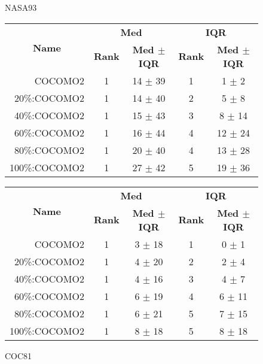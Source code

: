 \begin{figure}[!t]
\begin{center}
\caption{NASA93}
\scriptsize
\label{fig:nasa93}
\begin{tabular}{|r|c|c|c|c|}
\hline
\multicolumn{1}{|c|}{\multirow{2}{*}{\textbf{Name}}} & \multicolumn{2}{c|}{\textbf{Med}}     & \multicolumn{2}{c|}{\textbf{IQR}} \\ \cline{2-5} 
\multicolumn{1}{|c|}{}                               & \textbf{Rank} & \textbf{Med $\pm$ IQR} & \textbf{Rank} & \textbf{Med $\pm$ IQR} \\ \hline
    COCOMO2  & 1 & 14 $\pm$ 39   & 1    & 1 $\pm$ 2     \\ \cline{4-5}
20\%:COCOMO2 & 1 & 14 $\pm$ 40   & 2    & 5 $\pm$ 8   \\ \cline{4-5}
40\%:COCOMO2 & 1 & 15 $\pm$ 43   & 3    & 8 $\pm$ 14   \\ \cline{4-5}
60\%:COCOMO2 & 1 & 16 $\pm$ 44   & 4    & 12 $\pm$ 24   \\
80\%:COCOMO2 & 1 & 20 $\pm$ 40   & 4    & 13 $\pm$ 28   \\\cline{4-5}
100\%:COCOMO2 & 1 & 27 $\pm$ 42  & 5    & 19 $\pm$ 36    \\ \hline  
\end{tabular}

\caption{COC81}
\scriptsize
\label{fig:coc81}
\begin{tabular}{|r|c|c|c|c|}
\hline
\multicolumn{1}{|c|}{\multirow{2}{*}{\textbf{Name}}} & \multicolumn{2}{c|}{\textbf{Med}}     & \multicolumn{2}{c|}{\textbf{IQR}} \\ \cline{2-5} 
\multicolumn{1}{|c|}{}                               & \textbf{Rank} & \textbf{Med $\pm$ IQR} & \textbf{Rank} & \textbf{Med $\pm$ IQR} \\ \hline
    COCOMO2  & 1 & 3 $\pm$ 18   & 1    & 0 $\pm$ 1     \\ \cline{4-5}
20\%:COCOMO2 & 1 & 4 $\pm$ 20   & 2    & 2 $\pm$ 4   \\ \cline{4-5}
40\%:COCOMO2 & 1 & 4 $\pm$ 16   & 3    & 4 $\pm$ 7   \\ \cline{4-5}
60\%:COCOMO2 & 1 & 6 $\pm$ 19   & 4    & 6 $\pm$ 11   \\ \cline{4-5}
80\%:COCOMO2 & 1 & 6 $\pm$ 21   & 5    & 7 $\pm$ 15   \\
100\%:COCOMO2 & 1 & 8 $\pm$ 18  & 5    & 8 $\pm$ 18    \\ \hline        
\end{tabular}
\end{center}
\end{figure}